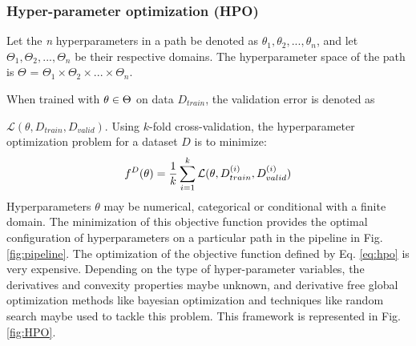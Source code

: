 \subsubsection{Hyper-parameter optimization (HPO)}
\label{subsubsec_HPO}
Let the \textit{n} hyperparameters in a path be denoted as $\theta_1, \theta_2, ..., \theta_n$, and let $\Theta_1, \Theta_2, ..., \Theta_n$ be their respective domains. The hyperparameter space of the path is  \textbf{$\Theta$} = $\Theta_1 \times \Theta_2 \times ... \times \Theta_n$.


When trained with $\emph{$\theta$} \in \textbf{$\Theta$}$ on data $D_{train}$, the validation error is denoted as \par
\noindent $\mathcal{L}(\theta, D_{train}, D_{valid})$. Using $k$-fold cross-validation, the hyperparameter optimization problem for a dataset $D$ is to minimize:
\begin{equation}
f^D(\theta) = \frac{1}{k}\sum_{i=1}^{k} \mathcal{L}(\emph{$\theta$}, D_{train}^{(i)}, D_{valid}^{(i)})
\label{eq:hpo}
\end{equation}
Hyperparameters $\theta$ may be numerical, categorical or conditional with a finite domain. The minimization of this objective function provides the optimal configuration of hyperparameters on a particular path in the pipeline in Fig. \ref{fig:pipeline}. The optimization of the objective function defined by Eq. \ref{eq:hpo} is very expensive. Depending on the type of hyper-parameter variables, the derivatives and convexity properties maybe unknown, and derivative free global optimization methods like bayesian optimization and techniques like random search maybe used to tackle this problem. This framework is represented in Fig. \ref{fig:HPO}.


